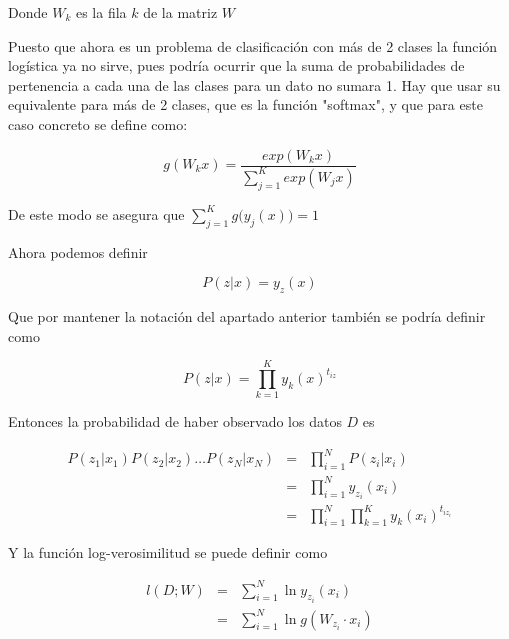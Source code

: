 \documentclass[a4paper]{article}
\begin{document}
\begin{enumerate}
{       Donde $W_k$ es la fila $k$ de la matriz $W$

       Puesto que ahora es un problema de clasificación con más de 2 clases la
       función logística ya no sirve, pues podría ocurrir que la suma de probabilidades de pertenencia a cada una de las clases para un dato no sumara 1. Hay que usar su equivalente para más de 2 clases, que es la función "softmax", y que para este caso concreto se define como:

       \begin{equation*}
           g(W_kx) = \frac{exp(W_kx)}{\sum_{j = 1}^{K} exp(W_jx)}
       \end{equation*}

       De este modo se asegura que $\sum_{j = 1}^{K} g\big(y_j(x)\big) = 1$

       Ahora podemos definir

       \begin{equation*}
        P(z|x) = y_z(x)
       \end{equation*}

       Que por mantener la notación del apartado anterior también se podría definir como

       \begin{equation*}
        P(z|x) = \prod_{k = 1}^{K} y_k(x)^{t_{iz}}
       \end{equation*}

       Entonces la probabilidad de haber observado los datos $D$ es

       \begin{eqnarray*}
        P(z_1|x_1)P(z_2|x_2)\dots P(z_N|x_N)
        &=&
        \prod_{i = 1}^{N} P(z_i|x_i) \\
        &=&
        \prod_{i = 1}^{N} y_{z_i}(x_i) \\
        &=&
        \prod_{i = 1}^{N} \prod_{k = 1}^{K} y_k(x_i)^{t_{iz_i}}
       \end{eqnarray*}

       Y la función log-verosimilitud se puede definir como

       \begin{eqnarray*}
        l(D; W) &=&
        \sum_{i = 1}^{N}
        \ln y_{z_i}(x_i) \\
        &=&
        \sum_{i = 1}^{N}
        \ln g(W_{z_i}\cdot x_i)
       \end{eqnarray*}

}
\end{enumerate}
\end{document}
